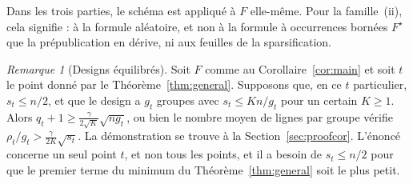 \documentclass[11pt,a4paper]{article}
\theoremstyle{definition}
\theoremstyle{remark}
\newtheorem{remark}[theorem]{Remarque}
\begin{document}
Dans les trois parties, le schéma est appliqué à $F$ elle-même. Pour la famille~(ii), cela
signifie : à la formule aléatoire, et non à la formule à occurrences bornées $F^\star$ que
la prépublication en dérive, ni aux feuilles de la sparsification.

\begin{remark}[Designs équilibrés]\label{rem:balanced}
Soit $F$ comme au Corollaire~\ref{cor:main} et soit $t$ le point donné par le
Théorème~\ref{thm:general}. Supposons que, en ce $t$ particulier, $s_t\le n/2$, et que le
design a $g_t$ groupes avec $s_t\le Kn/g_t$ pour un certain $K\ge1$. Alors
$q_t+1\ge\frac{\gamma}{2\sqrt K}\sqrt{ng_t}$, ou bien le nombre moyen de lignes par groupe
vérifie $\rho_t/g_t>\frac{\gamma}{2K}\sqrt{s_t}$. La démonstration se trouve à la
Section~\ref{sec:proofcor}. L'énoncé concerne un seul point $t$, et non tous les points, et
il a besoin de $s_t\le n/2$ pour que le premier terme du minimum du
Théorème~\ref{thm:general} soit le plus petit.
\end{remark}
\end{document}
